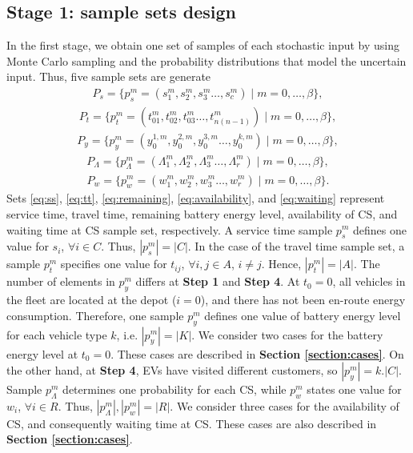 \documentclass[11pt]{article}
\begin{document}
\subsection{Stage 1: sample sets design}
\label{section:step1}
In the first stage, we obtain one set of samples of each stochastic input by using Monte Carlo sampling and the probability distributions that model the uncertain input. Thus, five sample sets are generate
\begin{align}
	\label{eq:ss}
	P_s = \{ p^m_s = (s^m_1, s^m_2, s^m_3 \ldots, s^m_c) \mid m = 0, \ldots, \beta \},
\end{align}
\begin{align}
	\label{eq:tt}
	P_t = \{ p^m_t = (t^m_{01}, t^m_{02}, t^m_{03} \ldots, t^m_{n(n-1)}) \mid m = 0, \ldots, \beta \},
\end{align}
\begin{align}
	\label{eq:remaining}
	P_y = \{ p^m_y = (y^{1,m}_0, y^{2,m}_0, y^{3,m}_0 \ldots, y^{k,m}_0) \mid m = 0, \ldots, \beta \},
\end{align}
\begin{align}
	\label{eq:availability}
	P_{\Lambda} = \{ p^m_{\Lambda} = (\Lambda^m_1, \Lambda^m_2, \Lambda^m_3 \ldots, \Lambda^m_r) \mid m = 0, \ldots, \beta \},
\end{align}
\begin{align}
	\label{eq:waiting}
	P_w = \{ p^m_w = (w^m_1, w^m_2, w^m_3 \ldots, w^m_r) \mid m = 0, \ldots, \beta \}.
\end{align}
Sets \eqref{eq:ss}, \eqref{eq:tt}, \eqref{eq:remaining}, \eqref{eq:availability}, and \eqref{eq:waiting} represent service time, travel time, remaining battery energy level, availability of CS, and waiting time at CS sample set, respectively. A service time sample $p^m_s$ defines one value for $s_i$, $\forall i \in C$. Thus, $|p^m_s| = |C|$. In the case of the travel time sample set, a sample $p^m_t$ specifies one value for $t_{ij}$,  $\forall i, j \in A$, $i \neq j$. Hence, $|p^m_t| = |A|$.  The number of elements in $p^m_y$ differs at \textbf{Step 1} and \textbf{Step 4}. At $t_0 = 0$, all vehicles in the fleet are located at the depot ($i=0$), and there has not been en-route energy consumption. Therefore, one sample $p^m_y$ defines one value of battery energy level for each vehicle type $k$, i.e. $|p^m_y| = |K|$. We consider two cases for the battery energy level at $t_0 = 0$. These cases are described in \textbf{Section \ref{section:cases}}. On the other hand, at \textbf{Step 4}, EVs have visited different customers, so $|p^m_y| = k.|C|$. Sample $p^m_{\Lambda}$ determines one probability for each CS, while $p^m_w$ states one value for $w_i$, $\forall i \in R$. Thus, $|p^m_{\Lambda}|, |p^m_w| = |R|$. We consider three cases for the availability of CS, and consequently waiting time at CS. These cases are also described in \textbf{Section \ref{section:cases}}. 
\end{document}
